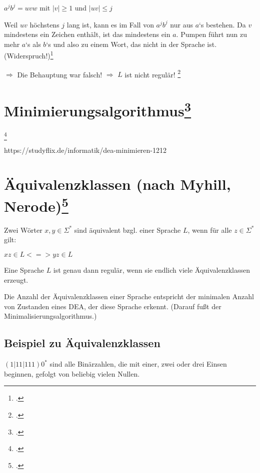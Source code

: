 \documentclass{lehramt-informatik-haupt}
\begin{document}
$a^j b^j = uvw$ mit $|v| \geq 1$ und $|uv| \leq j$

Weil $uv$ höchstens $j$ lang ist, kann es im Fall von $a^j b^j$ nur aus
$a$‘s bestehen. Da $v$ mindestens ein Zeichen enthält, ist das
mindestens ein $a$. Pumpen führt nun zu mehr $a$‘s als $b$‘s und also zu
einem Wort, das nicht in der Sprache ist. (Widerspruch!)\footcite{wiki:pumping}

$\Rightarrow$ Die Behauptung war falsch!
$\Rightarrow$ $L$ ist nicht regulär!
\footcite[Seite 63-64]{theo:fs:1}

%

\section{Minimierungsalgorithmus\footcite[Seite 47-57]{vossen}}

\footcite[Seite 51-62]{theo:fs:1}

https://studyflix.de/informatik/dea-minimieren-1212

%

\section{Äquivalenzklassen (nach Myhill, Nerode)\footcite{theo:fs:}}

Zwei Wörter $x, y \in \Sigma^*$ sind äquivalent bzgl. einer Sprache $L$,
wenn für alle $z \in Σ^*$ gilt:

$xz \in L <=> yz \in L$

Eine Sprache $L$ ist genau dann regulär, wenn sie endlich viele
Äquivalenzklassen erzeugt.

Die Anzahl der Äquivalenzklassen einer Sprache entspricht der
minimalen Anzahl von Zustanden eines DEA, der diese Sprache
erkennt. (Darauf fußt der Minimalisierungsalgorithmus.)

\subsection{Beispiel zu Äquivalenzklassen}

$(1|11|111)0^*$ sind alle Binärzahlen, die mit einer, zwei oder drei
Einsen beginnen, gefolgt von beliebig vielen Nullen.
\end{document}

